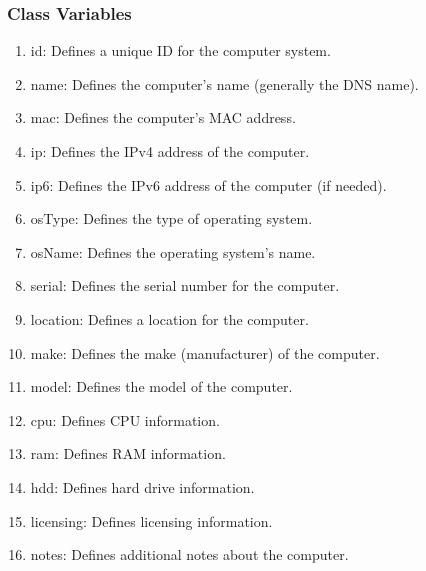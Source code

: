 \documentclass{article}
\begin{document}
\subsubsection{Class Variables}
\begin{enumerate}
\item id: Defines a unique ID for the computer system.
\item name: Defines the computer's name (generally the DNS name).
\item mac: Defines the computer's MAC address.
\item ip: Defines the IPv4 address of the computer.
\item ip6: Defines the IPv6 address of the computer (if needed).
\item osType: Defines the type of operating system.
\item osName: Defines the operating system's name.
\item serial: Defines the serial number for the computer.
\item location: Defines a location for the computer.
\item make: Defines the make (manufacturer) of the computer.
\item model: Defines the model of the computer.
\item cpu: Defines CPU information.
\item ram: Defines RAM information.
\item hdd: Defines hard drive information.
\item licensing: Defines licensing information.
\item notes: Defines additional notes about the computer.
\end{enumerate}
\end{document}
